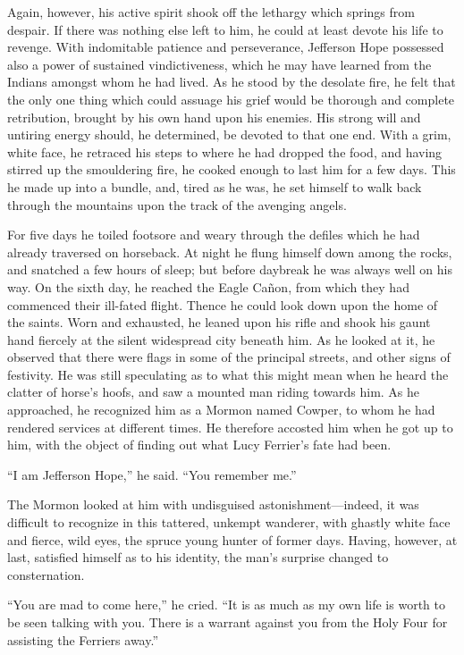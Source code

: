 \documentclass[12pt]{book}
\begin{document}
Again, however, his active spirit shook off the lethargy which springs from despair. If there was nothing else left to him, he could at least devote his life to revenge. With indomitable patience and perseverance, Jefferson Hope possessed also a power of sustained vindictiveness, which he may have learned from the Indians amongst whom he had lived. As he stood by the desolate fire, he felt that the only one thing which could assuage his grief would be thorough and complete retribution, brought by his own hand upon his enemies. His strong will and untiring energy should, he determined, be devoted to that one end. With a grim, white face, he retraced his steps to where he had dropped the food, and having stirred up the smouldering fire, he cooked enough to last him for a few days. This he made up into a bundle, and, tired as he was, he set himself to walk back through the mountains upon the track of the avenging angels. 

For five days he toiled footsore and weary through the defiles which he had already traversed on horseback. At night he flung himself down among the rocks, and snatched a few hours of sleep; but before daybreak he was always well on his way. On the sixth day, he reached the Eagle Cañon, from which they had commenced their ill-fated flight. Thence he could look down upon the home of the saints. Worn and exhausted, he leaned upon his rifle and shook his gaunt hand fiercely at the silent widespread city beneath him. As he looked at it, he observed that there were flags in some of the principal streets, and other signs of festivity. He was still speculating as to what this might mean when he heard the clatter of horse’s hoofs, and saw a mounted man riding towards him. As he approached, he recognized him as a Mormon named Cowper, to whom he had rendered services at different times. He therefore accosted him when he got up to him, with the object of finding out what Lucy Ferrier’s fate had been. 

“I am Jefferson Hope,” he said. “You remember me.” 

The Mormon looked at him with undisguised astonishment—indeed, it was difficult to recognize in this tattered, unkempt wanderer, with ghastly white face and fierce, wild eyes, the spruce young hunter of former days. Having, however, at last, satisfied himself as to his identity, the man’s surprise changed to consternation. 

“You are mad to come here,” he cried. “It is as much as my own life is worth to be seen talking with you. There is a warrant against you from the Holy Four for assisting the Ferriers away.” 
\end{document}
